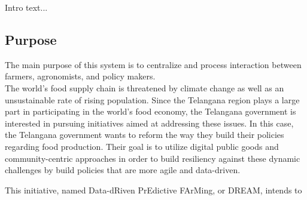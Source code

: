 Intro text...

\subsection{Purpose}


The main purpose of this system is to centralize and process interaction between farmers, agronomists, and policy makers. \\

The world's food supply chain is threatened by climate change as well as an unsustainable rate of rising population. Since the Telangana region plays a large part in participating in the world's food economy, the Telangana government is interested in pursuing initiatives aimed at addressing these issues. In this case, the Telangana government wants to reform the way they build their policies regarding food production. Their goal is to utilize digital public goods and community-centric approaches in order to build resiliency against these dynamic challenges by build policies that are more agile and data-driven. 

This initiative, named Data-dRiven PrEdictive FArMing, or DREAM, intends to 



